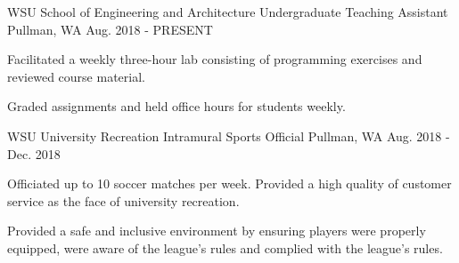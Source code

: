 \begin{cventries}
  \cventry
    {WSU School of Engineering and Architecture}
    {Undergraduate Teaching Assistant}
    {Pullman, WA}
    {Aug. 2018 - PRESENT}
    {
      \begin{cvitems}
        \item{Facilitated a weekly three-hour lab consisting of programming exercises and reviewed course material.}
        \item {Graded assignments and held office hours for students weekly.}
      \end{cvitems}
    }
  \cventry
    {WSU University Recreation}
    {Intramural Sports Official}
    {Pullman, WA}
    {Aug. 2018 - Dec. 2018}
    {
      \begin{cvitems}
        \item {Officiated up to 10 soccer matches per week. Provided a high quality of customer service as the face of university recreation.}
        \item {Provided a safe and inclusive environment by ensuring players were properly equipped, were aware of the league's rules and complied with the league's rules.}
      \end{cvitems}
    }
    
\end{cventries}